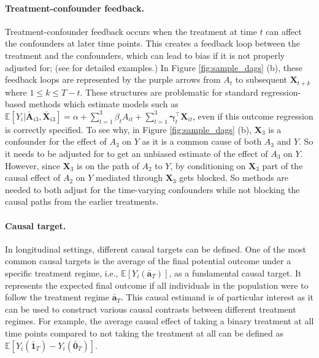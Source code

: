\paragraph{Treatment-confounder feedback.}
Treatment-confounder feedback occurs when the treatment at time $t$ can affect the confounders at later 
time points. This creates a feedback loop between the treatment and the confounders, 
which can lead to bias if it is not properly adjusted for; (see 
for detailed examples.) In Figure \ref{fig:sample_dags} (b), these feedback loops 
are represented by the purple arrows from $A_t$ to subsequent $\mathbf{X}_{t+k}$ where $1 \le k \le T-t$. These structures 
are problematic for standard regression-based methods which estimate 
models such as $\mathbb{E}[Y_i|\bar{\mathbf{A}}_{i3},\bar{\mathbf{X}}_{i3}] = \alpha + \sum_{t=1}^{3} \beta_t A_{it} + \sum_{t=1}^{3}\boldsymbol{\gamma}_t^\top \mathbf{X}_{it}$, 
even 
if this outcome regression is correctly specified. To see why, in Figure \ref{fig:sample_dags} (b), 
$\mathbf{X}_3$ is a confounder for the effect of $A_3$ on $Y$ as it is a common cause of both $A_3$ and $Y$. So it needs to be adjusted for to get an unbiased estimate of the effect of $A_3$ on $Y$. 
However, since $\mathbf{X}_3$ is on the path of $A_2$ to $Y$, by conditioning on $\mathbf{X}_3$ 
part of the causal effect of $A_2$ on $Y$ mediated through $\mathbf{X}_3$ gets blocked. So methods are needed to both adjust for the 
time-varying confounders while not blocking the causal paths from the earlier treatments. 

\paragraph{Causal target.} In longitudinal settings, different causal 
targets can be defined. One of the most common causal targets is 
the average of the final potential outcome under a specific treatment 
regime, i.e., $\mathbb{E}[Y_i(\bar{\mathbf{a}}_T)]$, as a fundamental causal target. 
It represents the expected final outcome if all individuals in the population were to follow the treatment 
regime $\bar{\mathbf{a}}_T$. This causal estimand is 
of particular interest as it can be used to construct various causal contrasts between different treatment regimes. 
For example, the average causal effect of taking a binary treatment at all time points compared to not 
taking the treatment at all can be defined as $\mathbb{E}[Y_i(\bar{\mathbf{1}}_T) - Y_i(\bar{\mathbf{0}}_T)]$.

